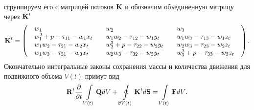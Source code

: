 сгруппируем его с матрицей потоков ${\bf{K}}$ и обозначим объединенную матрицу через ${\bf{K}}^t $
\begin{equation}
  \label{10} 
  {\bf{K}}^t  = \left( {\begin{array}{*{20}c}
   \begin{array}{l}
   w_1  \\
   w_1^2  + p - \tau _{11}  - w_1 x_t  \\
   w_1 w_2  - \tau _{21}  - w_2 x_t  \\
   w_1 w_3  - \tau _{31}  - w_3 x_t  \\
   \end{array} & \begin{array}{l}
   w_2  \\
   w_1 w_2  - \tau _{12}  - w_1 y_t  \\
   w_2^2  + p - \tau _{22}  - w_2 y_t  \\
   w_2 w_3  - \tau _{32}  - w_3 y_t  \\
   \end{array} & \begin{array}{l}
   w_3  \\
   w_1 w_3  - \tau _{13}  - w_1 z_t  \\
   w_2 w_3  - \tau _{23}  - w_2 z_t  \\
   w_3^2  + p - \tau _{33}  - w_3 z_t  \\
   \end{array}  \\
  \end{array}} \right).
\end{equation}
Окончательно интегральные законы сохранения массы и количества движения для подвижного объема $V(t)$ примут 
вид
\begin{equation}
  \label{11} 
  {\bf{R}}^t \frac{\partial }{{\partial t}}\int\limits_{V(t)} {{\bf{Q}}dV +
  \displaystyle\oint\limits_{\partial V(t)} {{\bf{K}}^t d{\bf{S}}} =
  \int\limits_{V(t)} {{\bf{F}}dV} }.
\end{equation}
